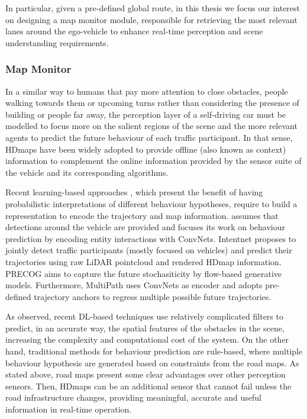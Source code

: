 In particular, given a pre-defined global route, in this thesis we focus our interest on designing a map monitor module, responsible for retrieving the most relevant lanes around the ego-vehicle to enhance real-time perception and scene understanding requirements.

\subsubsection{Map Monitor}
\label{subsubsec:4_smartmot_mapmonitor}

In a similar way to humans that pay more attention to close obstacles, people walking towards them or upcoming turns rather than considering the presence of building or people far away, the perception layer of a self-driving car must be modelled to focus more on the salient regions of the scene \cite{sadeghian2019sophie} and the more relevant agents to predict the future behaviour of each traffic participant. In that sense, \acp{HDmap} have been widely adopted to provide offline (also known as context) information to complement the online information provided by the sensor suite of the vehicle and its corresponding algorithms. 

Recent learning-based approaches \cite{hong2019rules} \cite{chai2019multipath} \cite{gao2020vectornet} \cite{casas2018intentnet}, which present the benefit of having probabilistic interpretations of different behaviour hypotheses, require to build a representation to encode the trajectory and map information. \cite{hong2019rules} assumes that detections around the vehicle are provided and focuses its work on behaviour prediction by encoding entity interactions with ConvNets. Intentnet \cite{casas2018intentnet} proposes to jointly detect traffic participants (mostly focused on vehicles) and predict their trajectories using raw LiDAR pointcloud and rendered \ac{HDmap} information. PRECOG \cite{rhinehart2019precog} aims to capture the future stochasiticity by flow-based generative models. Furthermore, MultiPath \cite{chai2019multipath} uses ConvNets as encoder and adopts pre-defined trajectory anchors to regress multiple possible future trajectories. 

As observed, recent \ac{DL}-based techniques use relatively complicated filters to predict, in an accurate way, the spatial features of the obstacles in the scene, increasing the complexity and computational cost of the system. On the other hand, traditional methods for behaviour prediction are rule-based, where multiple behaviour hypothesis are generated based on constraints from the road maps. As stated above, road maps present some clear advantages over other perception sensors. Then, \acp{HDmap} can be an additional sensor that cannot fail unless the road infrastructure changes, providing meaningful, accurate and useful information in real-time operation.  

